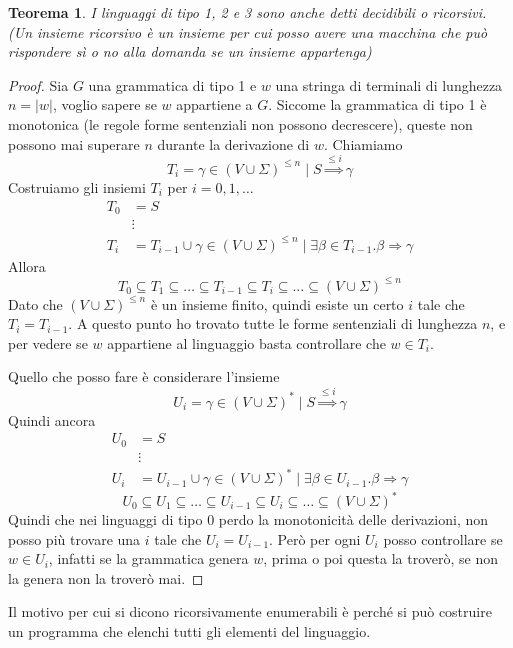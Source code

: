 \documentclass[12pt]{report}
\newtheorem{teorema}{Teorema}
\begin{document}
\begin{teorema}
	I linguaggi di tipo 1, 2 e 3 sono anche detti decidibili o ricorsivi.
	(Un insieme ricorsivo è un insieme per cui posso avere una macchina che può rispondere sì o no alla domanda se un insieme appartenga)
\end{teorema}
\begin{proof}
Sia $G$ una grammatica di tipo 1 e $w$ una stringa di terminali di lunghezza $n = |w|$, voglio sapere se $w$ appartiene a $G$.
Siccome la grammatica di tipo 1 è monotonica (le regole forme sentenziali non possono decrescere), queste non possono mai superare $n$ durante la derivazione di $w$.
Chiamiamo 
$$T_i = { \gamma \in (V \cup \Sigma)^{\leq n} \mid S \overset{\leq i}{\Rightarrow} \gamma }$$
Costruiamo gli insiemi $T_i$ per $i = 0, 1, \dots$
\begin{align*}
	T_0 &= { S } \\
	    &\vdots \\
	T_i &= T_{i - 1} \cup { \gamma \in (V \cup \Sigma)^{\leq n} \mid \exists \beta \in T_{i - 1} . \beta \Rightarrow \gamma } 
\end{align*}
Allora 
$$T_0 \subseteq T_1 \subseteq \dots \subseteq T_{i - 1} \subseteq T_{i} \subseteq \dots \subseteq (V \cup \Sigma)^{\leq n}$$
Dato che $(V \cup \Sigma)^{\leq n}$ è un insieme finito, quindi esiste un certo $i$ tale che $T_i = T_{i - 1}$.
A questo punto ho trovato tutte le forme sentenziali di lunghezza $n$, e per vedere se $w$ appartiene al linguaggio basta controllare che $w \in T_i$.


Quello che posso fare è considerare l'insieme 
$$U_i = { \gamma \in (V \cup \Sigma)^* \mid S \overset{\leq i}{\Rightarrow} \gamma }$$
Quindi ancora
\begin{align*}
	U_0 &= { S } \\
	    &\vdots \\
	U_i &= U_{i - 1} \cup { \gamma \in (V \cup \Sigma)^* \mid \exists \beta \in U_{i - 1} . \beta \Rightarrow \gamma } 
\end{align*}
$$U_0 \subseteq U_1 \subseteq \dots \subseteq U_{i - 1} \subseteq U_{i} \subseteq \dots \subseteq (V \cup \Sigma)^*$$
Quindi che nei linguaggi di tipo 0 perdo la monotonicità delle derivazioni, non posso più trovare una $i$ tale che $U_i = U_{i - 1}$.
Però per ogni $U_i$ posso controllare se $w \in U_i$, infatti se la grammatica genera $w$, prima o poi questa la troverò, se non la genera non la troverò mai.
\end{proof}

Il motivo per cui si dicono ricorsivamente enumerabili è perché si può costruire un programma che elenchi tutti gli elementi del linguaggio.
\end{document}
